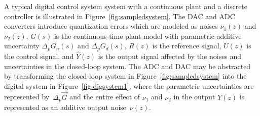 \documentclass{sig-alternate-05-2015}
\begin{document}
A typical digital control system system with a continuous plant and a discrete
controller is illustrated in Figure~\ref{fig:sampledsystem}.  The DAC and
ADC converters introduce quantization errors which are modeled as noises $\nu_{1}(z)$ and $\nu_{2}(z)$,
$G(s)$ is the continuous-time plant model with parametric additive
uncertainty $\Delta_p{G}_n(s)$ and $\Delta_p{G}_d(s)$, $R(z)$ is the reference signal, $U(z)$ is
the control signal, and $\hat{Y}(z)$ is the output signal affected by the
noises and uncertainties in the closed-loop system.
%
%
%
The ADC and DAC may be abstracted by transforming the closed-loop system in
Figure~\ref{fig:sampledsystem} into the digital system in 
Figure~\ref{fig:digsystem1}, where the parametric uncertainties are
represented by~$\Delta_p \vec{G}$
%
%
and the entire effect of $\nu_{1}$ and $\nu_{2}$ in the output $Y(z)$ is
represented as an additive output noise~$\nu(z)$. 
\end{document}
